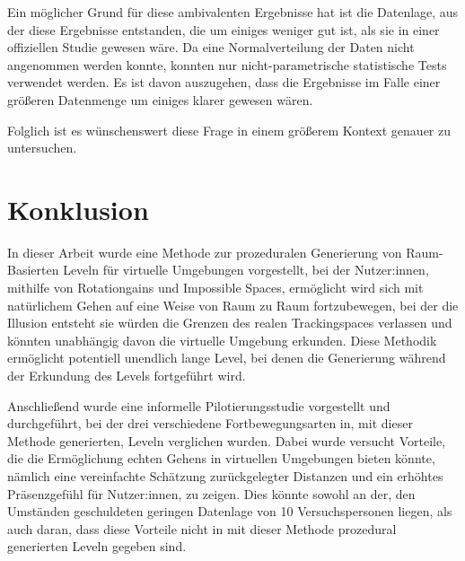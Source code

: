             Ein möglicher Grund für diese ambivalenten Ergebnisse hat ist die Datenlage, aus der diese Ergebnisse entstanden, die um einiges weniger gut ist, als sie in einer offiziellen Studie gewesen wäre. Da eine Normalverteilung der Daten nicht angenommen werden konnte, konnten nur nicht-parametrische statistische Tests verwendet werden.
            Es ist davon auszugehen, dass die Ergebnisse im Falle einer größeren Datenmenge um einiges klarer gewesen wären.

            Folglich ist es wünschenswert diese Frage in einem größerem Kontext genauer zu untersuchen.

    \section{Konklusion}
        In dieser Arbeit wurde eine Methode zur prozeduralen Generierung von Raum-Basierten Leveln für virtuelle Umgebungen vorgestellt, bei der  Nutzer:innen, mithilfe von Rotationgains und Impossible Spaces, ermöglicht wird sich mit natürlichem Gehen auf eine Weise von Raum zu Raum fortzubewegen, bei der die Illusion entsteht sie würden die Grenzen des realen Trackingspaces verlassen und könnten unabhängig davon die virtuelle Umgebung erkunden. Diese Methodik ermöglicht potentiell unendlich lange Level, bei denen die Generierung während der Erkundung des Levels fortgeführt wird.

        Anschließend wurde eine informelle Pilotierungsstudie vorgestellt und durchgeführt, bei der drei verschiedene Fortbewegungsarten in, mit dieser Methode generierten, Leveln verglichen wurden. Dabei wurde versucht Vorteile, die die Ermöglichung echten Gehens in virtuellen Umgebungen bieten könnte, nämlich eine vereinfachte Schätzung zurückgelegter Distanzen und ein erhöhtes Präsenzgefühl für Nutzer:innen, zu zeigen. Dies könnte sowohl an der, den Umständen geschuldeten geringen Datenlage von 10 Versuchspersonen liegen, als auch daran, dass diese Vorteile nicht in mit dieser Methode prozedural generierten Leveln gegeben sind.



